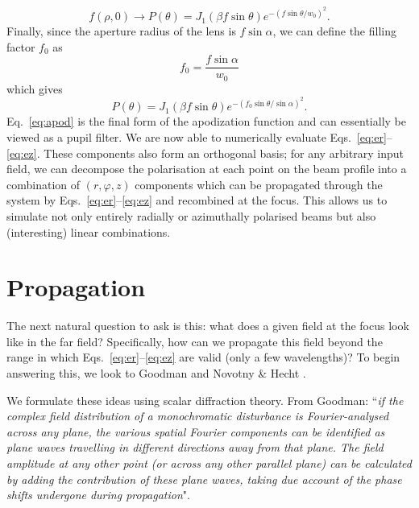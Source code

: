 \documentclass[12pt,a4paper]{article}
\begin{document}
\begin{displaymath}
	f\!\left(\rho,0\right)\to P\!\left(\theta\right)=J_{1}\!\left(\beta f\sin{\theta}\right)e^{-(f\sin{\theta}/w_{0})^{2}}.
\end{displaymath}
Finally, since the aperture radius of the lens is \(f\sin{\alpha}\), we can define the filling factor \(f_{0}\) as
\begin{displaymath}
	f_{0}= \frac{f\sin{\alpha}}{w_{0}}
\end{displaymath}
which gives
\begin{equation}
	\label{eq:apod}
	P\!\left(\theta\right)=J_{1}\!\left(\beta f\sin{\theta}\right)e^{-(f_{0}\sin{\theta}/\sin{\alpha})^{2}}.
\end{equation}
Eq.~\eqref{eq:apod} is the final form of the apodization function and can essentially be viewed as a pupil filter. We are now able to numerically evaluate Eqs.~\eqref{eq:er}--\eqref{eq:ez}. These components also form an orthogonal basis; for any arbitrary input field, we can decompose the polarisation at each point on the beam profile into a combination of \((r,\varphi,z)\) components which can be propagated through the system by Eqs.~\eqref{eq:er}--\eqref{eq:ez} and recombined at the focus. This allows us to simulate not only entirely radially or azimuthally polarised beams but also (interesting) linear combinations.
\section{Propagation}
The next natural question to ask is this: what does a given field at the focus look like in the far field? Specifically, how can we propagate this field beyond the range in which Eqs.~\eqref{eq:er}--\eqref{eq:ez} are valid (only a few wavelengths)? To begin answering this, we look to Goodman \cite{goodman} and Novotny \& Hecht \cite{hecht_nov}.

We formulate these ideas using scalar diffraction theory. From Goodman: ``\emph{if the complex field distribution of a monochromatic disturbance is Fourier-analysed across any plane, the various spatial Fourier components can be identified as plane waves travelling in different directions away from that plane. The field amplitude at any other point (or across any other parallel plane) can be calculated by adding the contribution of these plane waves, taking due account of the phase shifts undergone during propagation}".
\end{document}
